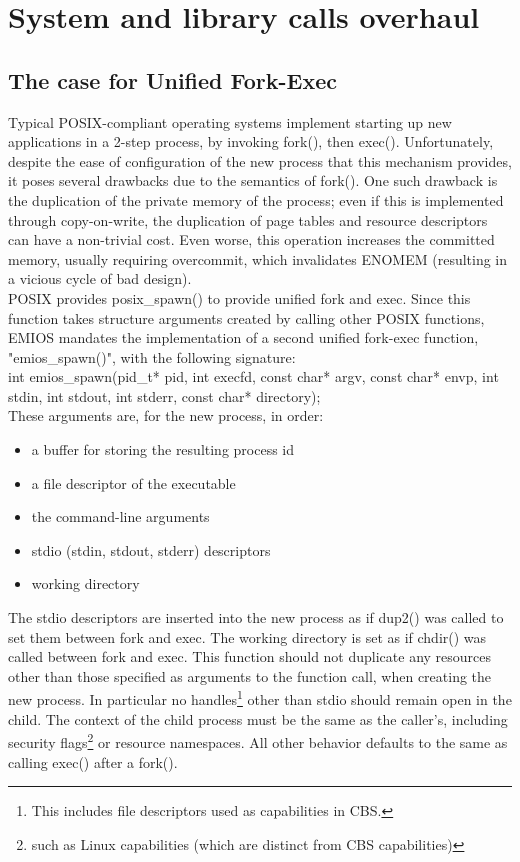 \section{System and library calls overhaul}
\subsection{The case for Unified Fork-Exec}
Typical POSIX-compliant operating systems implement starting up new applications in a 2-step process, by invoking fork(), then exec(). Unfortunately, despite the ease of configuration of the new process that this mechanism provides, it poses several drawbacks due to the semantics of fork(). One such drawback is the duplication of the private memory of the process; even if this is implemented through copy-on-write, the duplication of page tables and resource descriptors can have a non-trivial cost. Even worse, this operation increases the committed memory, usually requiring overcommit, which invalidates ENOMEM (resulting in a vicious cycle of bad design).\\
POSIX provides posix\_spawn() to provide unified fork and exec. Since this function takes structure arguments created by calling other POSIX functions, EMIOS mandates the implementation of a second unified fork-exec function, "emios\_spawn()", with the following signature:\\
int emios\_spawn(pid\_t* pid, int execfd, const char* argv, const char* envp, int stdin, int stdout, int stderr, const char* directory);\\
These arguments are, for the new process, in order:
\begin{itemize}
	\item a buffer for storing the resulting process id
	\item a file descriptor of the executable
	\item the command-line arguments
	\item stdio (stdin, stdout, stderr) descriptors
	\item working directory
\end{itemize}
The stdio descriptors are inserted into the new process as if dup2() was called to set them between fork and exec. The working directory is set as if chdir() was called between fork and exec. This function should not duplicate any resources other than those specified as arguments to the function call, when creating the new process. In particular no handles\footnote{This includes file descriptors used as capabilities in CBS.} other than stdio should remain open in the child. The context of the child process must be the same as the caller's, including security flags\footnote{such as Linux capabilities (which are distinct from CBS capabilities)} or resource namespaces. All other behavior defaults to the same as calling exec() after a fork().
